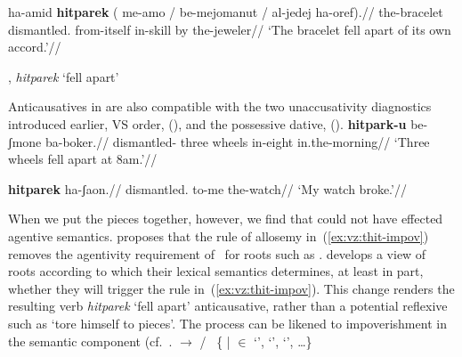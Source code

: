 {\pex
	\a \begingl
	\gla ha-{\texttslig}amid \textbf{hitparek} ({\cmark} me-a{\texttslig}mo / {\xmark} be-mejomanut / {\xmark} al-jedej ha-{\texttslig}oref).//
	\glb the-bracelet dismantled. {} from-itself {} {} in-skill {} {} by the-jeweler//
	\glft `The bracelet fell apart of its own accord.'//
	\endgl

	\a {\thit}, \emph{hitparek} `fell apart'\\
\xe

Anticausatives in {\thit} are also compatible with the two unaccusativity diagnostics introduced earlier,  VS order, (\nextx), and the possessive dative, (\anextx).
\ex\label{ex:vs-anticaus} \begingl
	\gla{}\textbf{hitpark-u}   be-ʃmone ba-boker.//
	\glb dismantled- three wheels in-eight in.the-morning//
	\glft `Three wheels fell apart at 8am.'//
	\endgl
\xe

\ex
\begingl
\gla{}\textbf{hitparek}  ha-ʃaon.//
\glb dismantled. to-me the-watch//
\glft `My watch broke.'//
\endgl
\xe

When we put the pieces together, however, we find that {\va} could not have effected agentive semantics. \cite{kastner17gjgl} proposes that the rule of allosemy in~(\ref{ex:vz:thit-impov}) removes the agentivity requirement of {\va}~for roots such as . \cite{kastner16phd,kastner17gjgl} develops a view of roots according to which their lexical semantics determines, at least in part, whether they will trigger the rule in~(\ref{ex:vz:thit-impov}). This change renders the resulting verb \emph{hitparek} `fell apart' anticausative, rather than a potential reflexive such as `tore himself to pieces'. The process can be likened to impoverishment \citep{bonet91,noyer98} in the semantic component (cf.~\citealt{nevins15roots}.
\ex\label{ex:vz:thit-impov}\denote{\va~\!} $\rightarrow$ {\zero} / {\vz} \trace~\{ | 
	  $\in$  `',  `',  `', \dots\}
\xe

}
